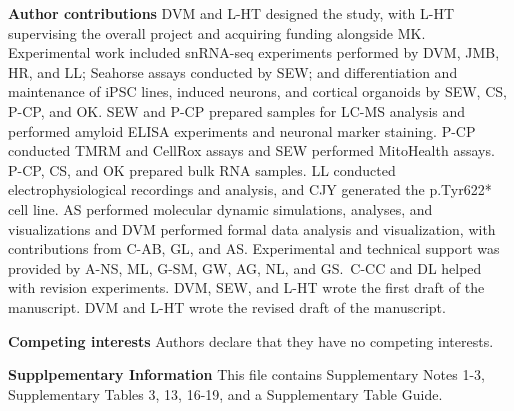\textbf{Author contributions}\newline\newline
DVM and L-HT designed the study, with L-HT supervising the overall project and acquiring funding alongside MK. Experimental work included snRNA-seq experiments performed by DVM, JMB, HR, and LL; Seahorse assays conducted by SEW; and differentiation and maintenance of iPSC lines, induced neurons, and cortical organoids by SEW, CS, P-CP, and OK. SEW and P-CP prepared samples for LC-MS analysis and performed amyloid ELISA experiments and neuronal marker staining. P-CP conducted TMRM and CellRox assays and SEW performed MitoHealth assays. P-CP, CS, and OK prepared bulk RNA samples. LL conducted electrophysiological recordings and analysis, and CJY generated the p.Tyr622* cell line. AS performed molecular dynamic simulations, analyses, and visualizations and DVM performed formal data analysis and visualization, with contributions from C-AB, GL, and AS. Experimental and technical support was provided by A-NS, ML, G-SM, GW, AG, NL, and GS. C-CC and DL helped with revision experiments. DVM, SEW, and L-HT wrote the first draft of the manuscript. DVM and L-HT wrote the revised draft of the manuscript.

\textbf{Competing interests}\newline\newline
Authors declare that they have no competing interests.

\textbf{Supplpementary Information}\newline\newline
This file contains Supplementary Notes 1-3, Supplementary Tables 3, 13, 16-19, and a Supplementary Table Guide.

